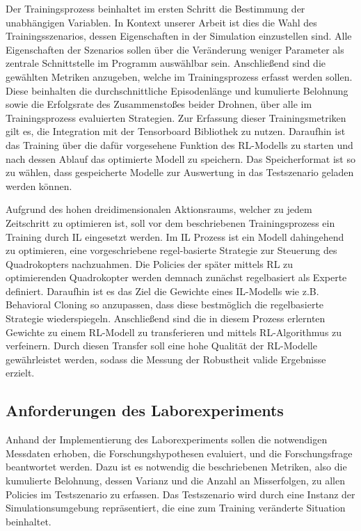 Der Trainingsprozess beinhaltet im ersten Schritt die Bestimmung der unabhängigen Variablen. 
In Kontext unserer Arbeit ist dies die Wahl des Trainingsszenarios, dessen Eigenschaften in der Simulation einzustellen sind.
Alle Eigenschaften der Szenarios sollen über die Veränderung weniger Parameter als zentrale Schnittstelle im Programm auswählbar sein.
Anschließend sind die gewählten Metriken anzugeben, welche im Trainingsprozess erfasst werden sollen.
Diese beinhalten die durchschnittliche Episodenlänge und kumulierte Belohnung sowie die Erfolgsrate des Zusammenstoßes beider Drohnen, über alle im Trainingsprozess evaluierten Strategien.
Zur Erfassung dieser Trainingsmetriken gilt es, die Integration mit der Tensorboard Bibliothek zu nutzen.
Daraufhin ist das Training über die dafür vorgesehene Funktion des RL-Modells zu starten und nach dessen Ablauf das optimierte Modell zu speichern.
Das Speicherformat ist so zu wählen, dass gespeicherte Modelle zur Auswertung in das Testszenario geladen werden können.

Aufgrund des hohen dreidimensionalen Aktionsraums, welcher zu jedem Zeitschritt zu optimieren ist, soll vor dem beschriebenen Trainingsprozess ein Training durch IL eingesetzt werden.
Im IL Prozess ist ein Modell dahingehend zu optimieren, eine vorgeschriebene regel-basierte Strategie zur Steuerung des Quadrokopters nachzuahmen. 
Die Policies der später mittels RL zu optimierenden Quadrokopter werden demnach zunächst regelbasiert als Experte definiert. 
Daraufhin ist es das Ziel die Gewichte eines IL-Modells wie z.B. Behavioral Cloning so anzupassen, dass diese bestmöglich die regelbasierte Strategie wiederspiegeln.
Anschließend sind die in diesem Prozess erlernten Gewichte zu einem RL-Modell zu transferieren und mittels RL-Algorithmus zu verfeinern.
Durch diesen Transfer soll eine hohe Qualität der RL-Modelle gewährleistet werden, sodass die Messung der Robustheit valide Ergebnisse erzielt.

\subsection{Anforderungen des Laborexperiments}

Anhand der Implementierung des Laborexperiments sollen die notwendigen Messdaten erhoben, die Forschungshypothesen evaluiert, und die Forschungsfrage beantwortet werden.
Dazu ist es notwendig die beschriebenen Metriken, also die kumulierte Belohnung, dessen Varianz und die Anzahl an Misserfolgen, zu allen Policies im Testszenario zu erfassen.
Das Testszenario wird durch eine Instanz der Simulationsumgebung repräsentiert, die eine zum Training veränderte Situation beinhaltet.

